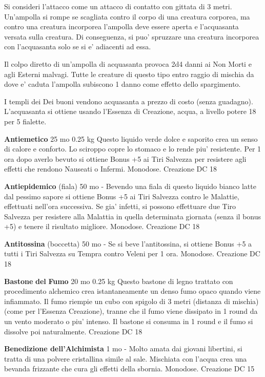 \documentclass[a4paper,11pt,twoside,openany]{book}
\begin{document}
{Si consideri l'attacco come un attacco di contatto con gittata di 3 metri. Un'ampolla si rompe se scagliata contro il corpo di una creatura corporea, ma contro una creatura incorporea l'ampolla deve essere aperta e l'acquasanta versata sulla creatura. Di conseguenza, si puo' spruzzare una creatura incorporea con l'acquasanta solo se si e' adiacenti ad essa.

Il colpo diretto di un'ampolla di acquasanta provoca 2d4 danni ai Non Morti e agli Esterni malvagi. Tutte le creature di questo tipo entro raggio di mischia da dove e' caduta l'ampolla subiscono 1 danno come effetto dello spargimento.

I templi dei Dei buoni vendono acquasanta a prezzo di costo (senza guadagno). L'acquasanta si ottiene usando l'Essenza di Creazione, acqua, a livello potere 18 per 5 fialette.

\textbf{Antiemetico} 25 mo 0.25 kg Questo liquido verde dolce e saporito crea un senso di calore e conforto. Lo sciroppo copre lo stomaco e lo rende piu' resistente. Per 1 ora dopo averlo bevuto si ottiene Bonus +5 ai Tiri Salvezza per resistere agli effetti che rendono Nauseati o Infermi. Monodose. Creazione DC 18

\textbf{Antiepidemico} (fiala) 50 mo - Bevendo una fiala di questo liquido bianco latte dal pessimo sapore si ottiene Bonus +5 ai Tiri Salvezza contro le Malattie, effettuati nell'ora successiva. Se gia' infetti, si possono effettuare due Tiro Salvezza per resistere alla Malattia in quella determinata giornata (senza il bonus +5) e tenere il risultato migliore. Monodose. Creazione DC 18

\textbf{Antitossina} (boccetta) 50 mo - Se si beve l'antitossina, si ottiene Bonus +5 a tutti i Tiri Salvezza su Tempra contro Veleni per 1 ora. Monodose. Creazione DC 18

\textbf{Bastone} \textbf{del} \textbf{Fumo} 20 mo 0.25 kg Questo bastone di legno trattato con procedimento alchemico crea istantaneamente un denso fumo opaco quando viene infiammato. Il fumo riempie un cubo con spigolo di 3 metri (distanza di mischia) (come per l'Essenza Creazione), tranne che il fumo viene dissipato in 1 round da un vento moderato o piu' intenso. Il bastone si consuma in 1 round e il fumo si dissolve
poi naturalmente. Creazione DC 18

\textbf{Benedizione dell'Alchimista} 1 mo - Molto amata dai giovani libertini, si tratta di una polvere cristallina simile al sale. Mischiata con l'acqua crea una bevanda frizzante che cura gli effetti della sbornia. Monodose. Creazione DC 15

}
\end{document}
